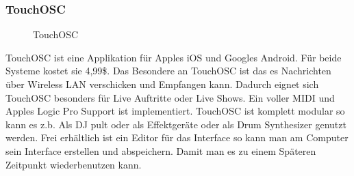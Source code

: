 \documentclass[a4paper, 12pt]{article}
\begin{document}
\subsubsection{TouchOSC}
\begin{figure}[!htb]
  \centering
  \caption[TouchOSC \cite{touchosc}]{TouchOSC} 
  \label{fig:touchosc}
\end{figure}
TouchOSC ist eine Applikation für Apples iOS und Googles Android. Für beide Systeme kostet sie 4,99\$. Das Besondere an TouchOSC ist das es Nachrichten über Wireless LAN verschicken und Empfangen kann. Dadurch eignet sich TouchOSC besonders für Live Auftritte oder Live Shows. Ein voller MIDI und Apples Logic Pro Support ist implementiert. TouchOSC ist komplett modular so kann es z.b. Als DJ pult oder als Effektgeräte oder als Drum Synthesizer genutzt werden. Frei erhältlich ist ein Editor für das Interface so kann man am Computer sein Interface erstellen und abspeichern. Damit man es zu einem Späteren Zeitpunkt wiederbenutzen kann.
\newpage
\renewcommand{\refname}{REFERENCES}



\listoffigures
\end{document}
